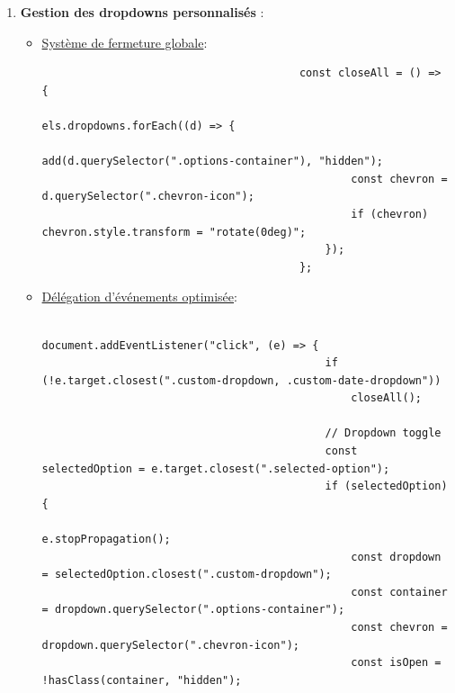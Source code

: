 \documentclass[a4paper,11pt]{article}
\begin{document}
\begin{enumerate}
                    \item \textbf{Gestion des dropdowns personnalisés} :
                        \begin{itemize}
                            \item \underline{Système de fermeture globale}:
                                \begin{tcolorbox}[colback=lightgray!5, colframe=gray!80, left=-70mm, right=5mm, top=2mm, bottom=0mm, boxrule=0.1mm]
                                    \begin{verbatim}
                                        const closeAll = () => {
                                            els.dropdowns.forEach((d) => {
                                                add(d.querySelector(".options-container"), "hidden");
                                                const chevron = d.querySelector(".chevron-icon");
                                                if (chevron) chevron.style.transform = "rotate(0deg)";
                                            });
                                        };
                                    \end{verbatim}
                                \end{tcolorbox}
                            \item \underline{Délégation d'événements optimisée}:
                                \begin{tcolorbox}[colback=lightgray!5, colframe=gray!80, left=-70mm, right=5mm, top=2mm, bottom=0mm, boxrule=0.1mm]
                                    \begin{verbatim}
                                        document.addEventListener("click", (e) => {
                                            if (!e.target.closest(".custom-dropdown, .custom-date-dropdown"))
                                                closeAll();

                                            // Dropdown toggle
                                            const selectedOption = e.target.closest(".selected-option");
                                            if (selectedOption) {
                                                e.stopPropagation();
                                                const dropdown = selectedOption.closest(".custom-dropdown");
                                                const container = dropdown.querySelector(".options-container");
                                                const chevron = dropdown.querySelector(".chevron-icon");
                                                const isOpen = !hasClass(container, "hidden");


\end{verbatim}
\end{tcolorbox}
\end{itemize}
\end{enumerate}
\end{document}
